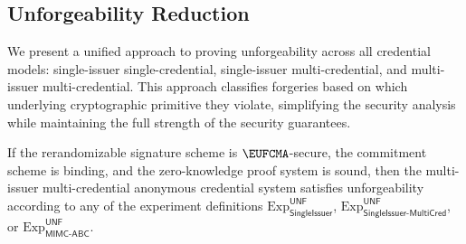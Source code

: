 \subsection{Unforgeability Reduction}

We present a unified approach to proving unforgeability across all credential models: single-issuer single-credential, single-issuer multi-credential, and multi-issuer multi-credential. This approach classifies forgeries based on which underlying cryptographic primitive they violate, simplifying the security analysis while maintaining the full strength of the security guarantees.

\begin{theorem}
If the rerandomizable signature scheme is $\EUFCMA$-secure, the commitment scheme is binding, and the zero-knowledge proof system is sound, then the multi-issuer multi-credential anonymous credential system satisfies unforgeability according to any of the experiment definitions $\mathrm{Exp}^{\mathsf{UNF}}_{\mathsf{SingleIssuer}}$, $\mathrm{Exp}^{\mathsf{UNF}}_{\mathsf{SingleIssuer\text{-}MultiCred}}$, or $\mathrm{Exp}^{\mathsf{UNF}}_{\mathsf{MIMC\text{-}ABC}}$.
\end{theorem}

